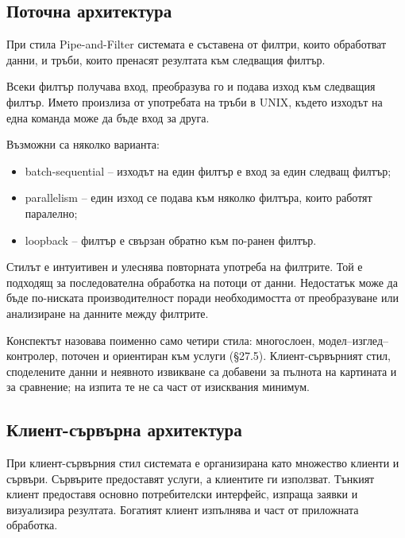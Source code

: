 \subsection{Поточна архитектура}\label{s:27.4.3}

\begin{defn}
При стила Pipe-and-Filter системата е съставена от филтри, които обработват данни, и тръби, които пренасят резултата към следващия филтър.
\end{defn}

Всеки филтър получава вход, преобразува го и подава изход към следващия филтър. Името произлиза от употребата на тръби в UNIX, където изходът на една команда може да бъде вход за друга.

Възможни са няколко варианта:

\begin{itemize}
    \item batch-sequential -- изходът на един филтър е вход за един следващ филтър;
    \item parallelism -- един изход се подава към няколко филтъра, които работят паралелно;
    \item loopback -- филтър е свързан обратно към по-ранен филтър.
\end{itemize}

Стилът е интуитивен и улеснява повторната употреба на филтрите. Той е подходящ за последователна обработка на потоци от данни. Недостатък може да бъде по-ниската производителност поради необходимостта от преобразуване или анализиране на данните между филтрите.

\begin{supp}
Конспектът назовава поименно само четири стила: многослоен, модел--изглед--контролер,
поточен и ориентиран към услуги (\S27.5). Клиент-сървърният стил, споделените
данни и неявното извикване са добавени за пълнота на картината и за сравнение;
на изпита те не са част от изисквания минимум.
\end{supp}

\subsection{Клиент-сървърна архитектура}\label{s:27.4.4}

\begin{defn}
При клиент-сървърния стил системата е организирана като множество клиенти и сървъри. Сървърите предоставят услуги, а клиентите ги използват. Тънкият клиент предоставя основно потребителски интерфейс, изпраща заявки и визуализира резултата. Богатият клиент изпълнява и част от приложната обработка.
\end{defn}

